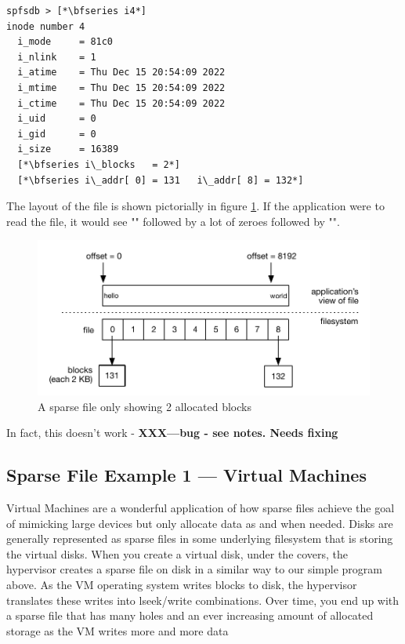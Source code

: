 \begin{lstlisting}
spfsdb > [*\bfseries i4*]
inode number 4
  i_mode     = 81c0
  i_nlink    = 1
  i_atime    = Thu Dec 15 20:54:09 2022
  i_mtime    = Thu Dec 15 20:54:09 2022
  i_ctime    = Thu Dec 15 20:54:09 2022
  i_uid      = 0
  i_gid      = 0
  i_size     = 16389
  [*\bfseries i\_blocks   = 2*]
  [*\bfseries i\_addr[ 0] = 131   i\_addr[ 8] = 132*]
\end{lstlisting}

\noindent
The layout of the file is shown pictorially in figure \ref{fig:sparse}. If the application were to read the file, it would see "" followed by a lot of zeroes followed by "".

\begin{figure}
	\includegraphics[scale=0.6]{figures/sparse.pdf}
	\centering
	\caption{A sparse file only showing 2 allocated blocks}
	\label{fig:sparse}
\end{figure}

In fact, this doesn't work - \textbf{XXX---bug - see notes. Needs fixing}

\subsection{Sparse File Example 1 --- Virtual Machines}

Virtual Machines are a wonderful application of how sparse files achieve the goal of mimicking large devices but only allocate data as and when needed. Disks are generally represented as sparse files in some underlying filesystem that is storing the virtual disks. When you create a virtual disk, under the covers, the hypervisor creates a sparse file on disk in a similar way to our simple program above. As the VM operating system writes blocks to disk, the hypervisor translates these writes into lseek/write combinations. Over time, you end up with a sparse file that has many holes and an ever increasing amount of allocated storage as the VM writes more and more data


